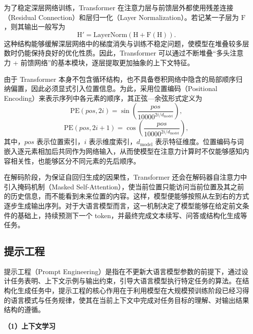 为了稳定深层网络训练，Transformer 在注意力层与前馈层外都使用残差连接（Residual Connection）和层归一化（Layer Normalization）。若记某一子层为 $\text{F}$，则其输出一般写为
\begin{equation}
\text{H}' = \mathrm{LayerNorm}(\text{H}+\text{F}(\text{H})).
\label{eq:transformer_residual}
\end{equation}
这种结构能够缓解深层网络中的梯度消失与训练不稳定问题，使模型在堆叠较多层数时仍能保持良好的优化性质。因此，Transformer 可以通过不断堆叠“多头注意力 + 前馈网络”的基本模块，逐层提取更加抽象的上下文特征。

由于 Transformer 本身不包含循环结构，也不具备卷积网络中隐含的局部顺序归纳偏置，因此必须显式引入位置信息。为此，采用位置编码（Positional Encoding）来表示序列中各元素的顺序，其正弦—余弦形式定义为
\begin{equation}
\mathrm{PE}(pos,2i)=\sin\left(\frac{pos}{10000^{2i/d_{\mathrm{model}}}}\right),
\end{equation}
\begin{equation}
\mathrm{PE}(pos,2i+1)=\cos\left(\frac{pos}{10000^{2i/d_{\mathrm{model}}}}\right),
\label{eq:transformer_pe}
\end{equation}
其中，$pos$ 表示位置索引，$i$ 表示维度索引，$d_{\mathrm{model}}$ 表示特征维度。位置编码与词嵌入逐元素相加后共同作为网络输入，从而使模型在注意力计算时不仅能够感知内容相关性，也能够区分不同元素的先后顺序。

在解码阶段，为保证自回归生成的因果性，Transformer 还会在解码器自注意力中引入掩码机制（Masked Self-Attention），使当前位置只能访问当前位置及其之前的历史信息，而不能看到未来位置的内容。这样，模型便能够按照从左到右的方式逐步生成输出序列。对于大语言模型而言，这一机制决定了模型能够在给定前文条件的基础上，持续预测下一个 token，并最终完成文本续写、问答或结构化生成等任务。


\subsection{提示工程}
\label{sec:prompt_engineering}

提示工程（Prompt Engineering）是指在不更新大语言模型参数的前提下，通过设计任务表明、上下文示例与输出约束，引导大语言模型执行特定任务的算法。在结构化生成任务中，提示工程的核心作用在于利用模型在大规模预训练阶段已经习得的语言模式与任务规律，使其在当前上下文中完成对任务目标的理解、对输出结果结构的遵循。


\noindent\textbf{（1）上下文学习}

